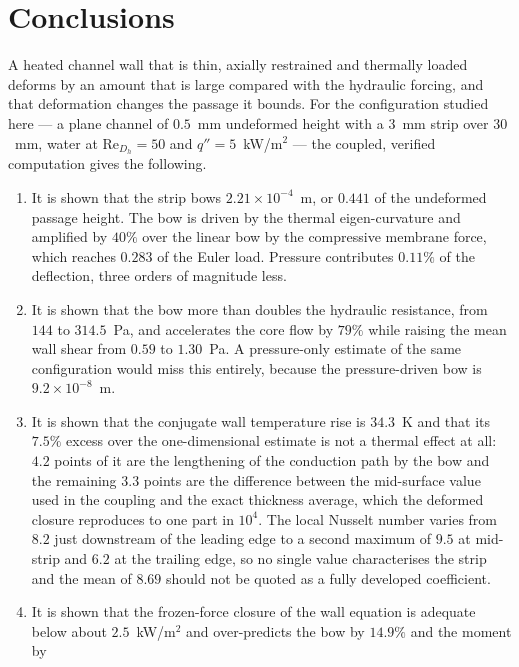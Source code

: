\documentclass[11pt,a4paper]{article}
\newcommand{\ReDh}{\mathrm{Re}_{D_h}}
\begin{document}

\section{Conclusions}
\label{sec:conclusions}

A heated channel wall that is thin, axially restrained and thermally loaded
deforms by an amount that is large compared with the hydraulic forcing, and
that deformation changes the passage it bounds. For the configuration studied
here --- a plane channel of $0.5$~mm undeformed height with a $3$~mm strip
over $30$~mm, water at $\ReDh=50$ and $q''=5$~kW/m$^2$ --- the coupled,
verified computation gives the following.

\begin{enumerate}
\item It is shown that the strip bows $2.21\times10^{-4}$~m, or $0.441$ of the undeformed
passage height. The bow is driven by the thermal eigen-curvature and amplified
by $40\%$ over the linear bow by the compressive membrane force, which reaches
$0.283$ of the Euler load. Pressure contributes $0.11\%$ of the deflection,
three orders of magnitude less.
\item It is shown that the bow more than doubles the hydraulic resistance, from $144$ to
$314.5$~Pa, and accelerates the core flow by $79\%$ while raising the mean
wall shear from $0.59$ to $1.30$~Pa. A pressure-only estimate of the same
configuration would miss this entirely, because the pressure-driven bow is
$9.2\times10^{-8}$~m.
\item It is shown that the conjugate wall temperature rise is $34.3$~K and that its
$7.5\%$ excess over the one-dimensional estimate is not a thermal effect at all: $4.2$ points of
it are the lengthening of the conduction path by the bow and the remaining $3.3$ points are the
difference between the mid-surface value used in the coupling and the exact thickness average,
which the deformed closure reproduces to one part in $10^{4}$. The local Nusselt number varies
from $8.2$ just downstream of the leading edge to a second maximum of $9.5$ at mid-strip and
$6.2$ at the trailing edge, so no single value characterises the strip and the mean of $8.69$
should not be quoted as a fully developed coefficient.
\item It is shown that the frozen-force closure of the wall equation is adequate below about
$2.5$~kW/m$^2$ and over-predicts the bow by $14.9\%$ and the moment by

\end{enumerate}
\end{document}
